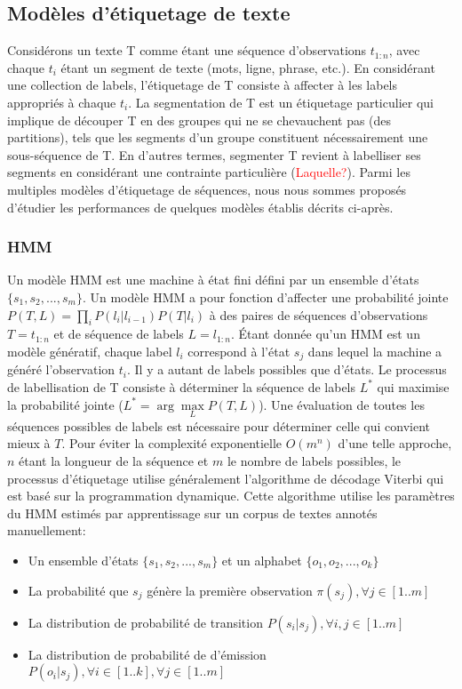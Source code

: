 \subsection{Modèles d'étiquetage de texte}

Considérons un texte T comme étant une séquence d'observations $t_{1:n}$, avec chaque $t_i$ étant un segment de texte (mots, ligne, phrase, etc.). En considérant une collection de labels, l'étiquetage de T consiste à affecter à les labels appropriés à chaque $t_i$. La segmentation de T est un étiquetage particulier qui implique de découper T en des groupes qui ne se chevauchent pas (des partitions), tels que les segments d'un groupe constituent nécessairement une sous-séquence de T. En d'autres termes, segmenter T revient à labelliser ses segments en considérant une contrainte particulière (\textcolor{red}{Laquelle?}). Parmi les multiples modèles d'étiquetage de séquences, nous nous sommes proposés d'étudier les performances de quelques modèles établis décrits ci-après.
\subsubsection{HMM}
Un modèle HMM est une machine à état fini défini par un ensemble d'états $ \lbrace s_1, s_2, ..., s_m \rbrace $. Un modèle HMM a pour fonction d'affecter une probabilité jointe 
$ P (T , L) = \prod\limits_i P(l_i \vert l_{i-1})P(T \vert l_i)$  à des paires de séquences d'observations $ T = t_{1: n} $ et de séquence de labels $ L = l_{1:n} $. Étant donnée qu'un HMM est un modèle génératif, chaque label $l_i$ correspond à l'état $s_j$ dans lequel la machine a généré l'observation $t_i$. Il y a autant de labels possibles que d'états. Le processus de labellisation de T consiste à déterminer la séquence de labels $ L^* $ qui maximise la probabilité jointe ($L^* = \arg \max\limits_L P(T, L)$). Une évaluation de toutes les séquences possibles de labels est nécessaire pour déterminer celle qui convient mieux à $ T $. Pour éviter la complexité exponentielle $ O(m^n)$ d'une telle approche, $n$ étant la longueur de la séquence et $m$ le nombre de labels possibles, le processus d'étiquetage utilise généralement l'algorithme de décodage Viterbi \citep{viterbi1967viterbi} qui est basé sur la programmation dynamique. Cette algorithme utilise les paramètres du HMM estimés par apprentissage sur un corpus de textes annotés manuellement:
\begin{itemize}
\item Un ensemble d'états $ \lbrace s_1, s_2, ..., s_m \rbrace $ et un alphabet $ \lbrace o_1, o_2, ..., o_k \rbrace $
\item La probabilité que $ s_j $ génère la première observation $ \pi(s_j), \forall j \in [1 .. m] $
\item La distribution de probabilité de transition $ P (s_i\vert s_j),  \forall i,j \in [1 .. m] $
\item La distribution de probabilité de d'émission $ P(o_i\vert s_j), \forall i \in [1 .. k], \forall j \in [1 .. m]$
\end{itemize}

